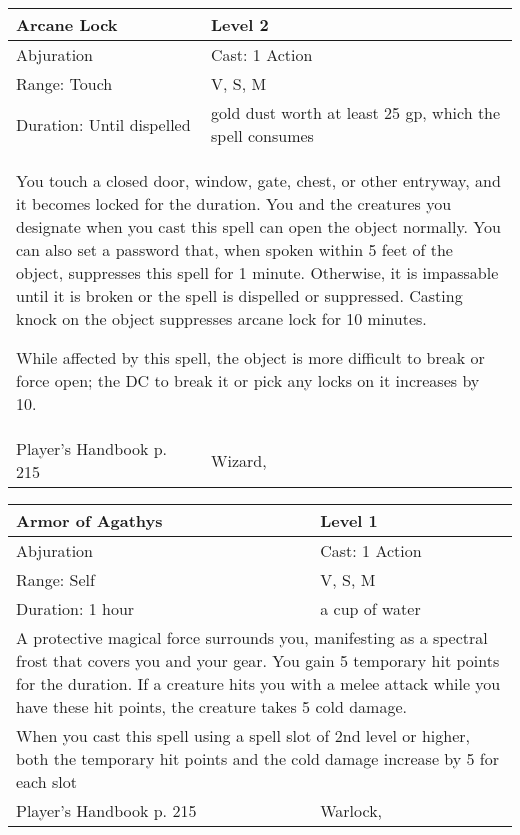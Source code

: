 \documentclass[11pt]{report}
\begin{document}
\begin{table}[H]
	\begin{tabular}{||p{6cm}|p{6cm}||}
		\hline\hline
		\bf{Arcane Lock} & Level 2\\ \hline
		Abjuration & Cast: 1 Action\\ \hline
		Range: Touch & V, S, M\\ \hline
		Duration: Until dispelled & gold dust worth at least 25 gp, which the spell consumes\\ \hline
		\multicolumn{2}{||p{12cm}||}{You touch a closed door, window, gate, chest, or other entryway, and it becomes locked for the duration. 
You and the creatures you designate when you cast this spell can open the object normally. You can also set a password that, when spoken within 5 feet of the object, suppresses this spell for 1 minute. Otherwise, it is impassable until it is broken or the spell is dispelled or suppressed. Casting knock on the object suppresses arcane lock for 10 minutes. 

While affected by this spell, the object is more difficult to break or force open; the DC to break it or pick any locks on it increases by 10.}\\ \hline
Player's Handbook p. 215 & Wizard, \\ \hline\hline
	\end{tabular}
\end{table}

\begin{table}[H]
	\begin{tabular}{||p{6cm}|p{6cm}||}
		\hline\hline
		\bf{Armor of Agathys} & Level 1\\ \hline
		Abjuration & Cast: 1 Action\\ \hline
		Range: Self & V, S, M\\ \hline
		Duration: 1 hour & a cup of water\\ \hline
		\multicolumn{2}{||p{12cm}||}{A protective magical force surrounds you, manifesting as a spectral frost that covers you and your gear. 
You gain 5 temporary hit points for the duration. If a creature hits you with a melee attack while you have these hit points, the creature takes 5 cold damage.}\\ \hline
		\multicolumn{2}{||p{12cm}||}{When you cast this spell using a spell slot of 2nd level or higher, both the temporary hit points and the cold damage increase by 5 for each slot}\\ \hline
Player's Handbook p. 215 & Warlock, \\ \hline\hline
	\end{tabular}
\end{table}
\end{document}
